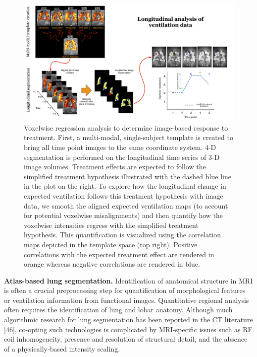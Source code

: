 \documentclass[11pt,]{article}
\begin{document}
\begin{figure}[htbp]
\centering
\includegraphics{Figs/longitudinalStudy.png}
\caption{Voxelwise regression analysis to determine image-based response
to treatment. First, a multi-modal, single-subject template is created
to bring all time point images to the same coordinate system. 4-D
segmentation is performed on the longitudinal time series of 3-D image
volumes. Treatment effects are expected to follow the simplified
treatment hypothesis illustrated with the dashed blue line in the plot
on the right. To explore how the longitudinal change in expected
ventilation follows this treatment hypothesis with image data, we smooth
the aligned expected ventilation maps (to account for potential
voxelwise misalignments) and then quantify how the voxelwise intensities
regress with the simplified treatment hypothesis. This quantification is
visualized using the correlation maps depicted in the template space
(top right). Positive correlations with the expected treatment effect
are rendered in orange whereas negative correlations are rendered in
blue.}
\end{figure}

\textbf{Atlas-based lung segmentation.} Identification of anatomical
structure in MRI is often a crucial preprocessing step for
quantification of morphological features or ventilation information from
functional images. Quantitative regional analysis often requires the
identification of lung and lobar anatomy. Although much algorithmic
research for lung segmentation has been reported in the CT literature
{[}46{]}, co-opting such technologies is complicated by MRI-specific
issues such as RF coil inhomogeneity, presence and resolution of
structural detail, and the absence of a physically-based intensity
scaling.
\end{document}

